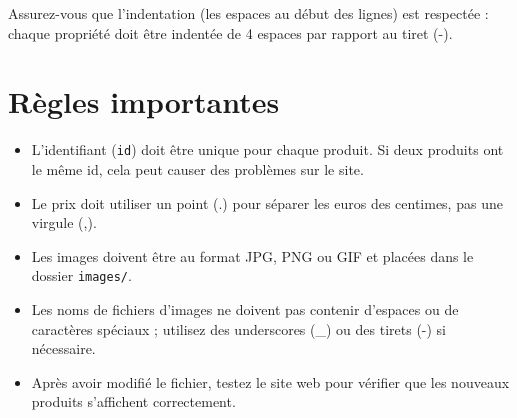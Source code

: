\documentclass[11pt]{article}
\begin{document}
Assurez-vous que l'indentation (les espaces au début des lignes) est respectée : chaque propriété doit être indentée de 4 espaces par rapport au tiret (-).

\section{Règles importantes}

\begin{itemize}
\item L'identifiant (\texttt{id}) doit être unique pour chaque produit. Si deux produits ont le même id, cela peut causer des problèmes sur le site.
\item Le prix doit utiliser un point (.) pour séparer les euros des centimes, pas une virgule (,).
\item Les images doivent être au format JPG, PNG ou GIF et placées dans le dossier \texttt{images/}.
\item Les noms de fichiers d'images ne doivent pas contenir d'espaces ou de caractères spéciaux ; utilisez des underscores (\_) ou des tirets (-) si nécessaire.
\item Après avoir modifié le fichier, testez le site web pour vérifier que les nouveaux produits s'affichent correctement.
\end{itemize}
\end{document}

